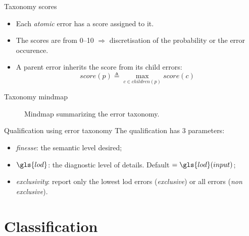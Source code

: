\documentclass{beamer}
\begin{document}
            \begin{frame}{Taxonomy scores}
                \begin{itemize}[label=$\blacktriangleright$, font=\color{IGNGreen}]
                    \item<1-> Each \emph{atomic} error has a score assigned to it.
                    \item<2-> The scores are from \numrange{0}{10} $\Rightarrow$ discretisation of the probability or the error occurence.
                    \item<3-> A parent error inherits the score from its child errors:
                    \begin{equation*}
                        score(p) \triangleq \max_{c \in children(p)} score(c)
                    \end{equation*}
                \end{itemize}
            \end{frame}
            \begin{frame}{Taxonomy mindmap}
                \begin{figure}
                    
                    \caption{\label{fig::mindmap} Mindmap summarizing the error taxonomy.}
                \end{figure}
            \end{frame}
            \begin{frame}{Qualification using error taxonomy}
                The qualification has $3$ parameters:
                \begin{itemize}[label=$\blacktriangleright$, font=\color{IGNGreen}]
                    \item<1-> \emph{finesse}: the semantic level desired;
                    \item<2-> $\gls{lod}$: the diagnostic level of details. Default $ = \gls{lod}(input) $;
                    \item<3-> \emph{exclusivity}: report only the lowest \gls{lod} errors (\emph{exclusive}) or all errors (\emph{non exclusive}).
                \end{itemize}
            \end{frame}
    \section{Classification}
\end{document}
